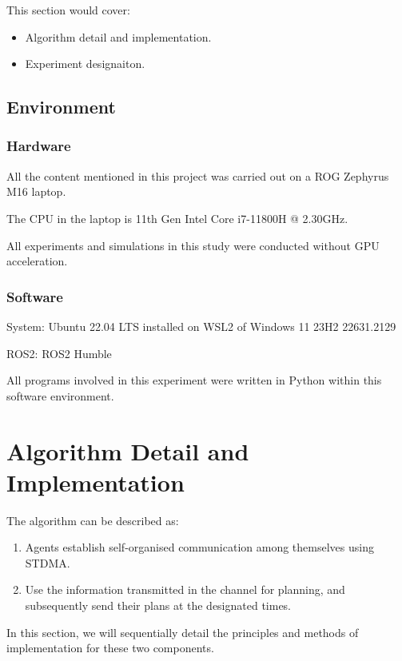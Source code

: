 
This section would cover:
\begin{itemize}
    \item Algorithm detail and implementation.
    \item Experiment designaiton.
\end{itemize}

\subsection*{Environment}
\subsubsection{Hardware}

\indent All the content mentioned in this project was carried out on a ROG Zephyrus M16 laptop.

The CPU in the laptop is 11th Gen Intel Core i7-11800H @ 2.30GHz.

All experiments and simulations in this study were conducted without GPU acceleration.

\subsubsection{Software}

\indent System: Ubuntu 22.04 LTS installed on WSL2 of Windows 11 23H2 22631.2129

ROS2: ROS2 Humble

All programs involved in this experiment were written in Python within this software environment.

\section{Algorithm Detail and Implementation}

The algorithm can be described as: 
\begin{enumerate}
    \item Agents establish self-organised communication among themselves using STDMA.
    \item Use the information transmitted in the channel for planning, and subsequently send their plans at the designated times.
\end{enumerate}

In this section, we will sequentially detail the principles and methods of implementation for these two components.


